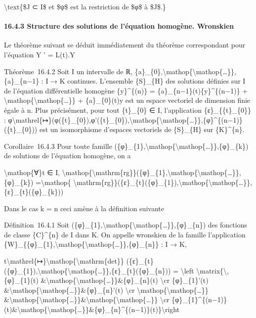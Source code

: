 \documentclass[]{article}
\begin{document}
\textbackslash{}text\{\$J ⊂ I\$ et \$ψ\$ est la restriction de \$φ\$ à
\$J\$.\}

\paragraph{16.4.3 Structure des solutions de l'équation homogène.
Wronskien}

Le théorème suivant se déduit immédiatement du théorème correspondant
pour l'équation Y ' = L(t).Y

Théorème~16.4.2 Soit I un intervalle de ℝ,
\{a\}\_\{0\},\textbackslash{}mathop\{\textbackslash{}mathop\{\ldots{}\}\},\{a\}\_\{n−1\}
: I → K continues. L'ensemble \{S\}\_\{H\} des solutions définies sur I
de l'équation différentielle homogène \{y\}\^{}\{(n)\} =
\{a\}\_\{n−1\}(t)\{y\}\^{}\{(n−1)\} +
\textbackslash{}mathop\{\textbackslash{}mathop\{\ldots{}\}\} +
\{a\}\_\{0\}(t)y est un espace vectoriel de dimension finie égale à n.
Plus précisément, pour tout \{t\}\_\{0\} ∈ I, l'application
\{ε\}\_\{\{t\}\_\{0\}\} :
φ\textbackslash{}mathrel\{↦\}(φ(\{t\}\_\{0\}),φ'(\{t\}\_\{0\}),\textbackslash{}mathop\{\textbackslash{}mathop\{\ldots{}\}\},\{φ\}\^{}\{(n−1)\}(\{t\}\_\{0\}))
est un isomorphisme d'espaces vectoriels de \{S\}\_\{H\} sur
\{K\}\^{}\{n\}.

Corollaire~16.4.3 Pour toute famille
(\{φ\}\_\{1\},\textbackslash{}mathop\{\textbackslash{}mathop\{\ldots{}\}\},\{φ\}\_\{k\})
de solutions de l'équation homogène, on a

\textbackslash{}mathop\{∀\}t ∈ I,
\textbackslash{}mathop\{\textbackslash{}mathrm\{rg\}\}(\{φ\}\_\{1\},\textbackslash{}mathop\{\textbackslash{}mathop\{\ldots{}\}\},\{φ\}\_\{k\})
=\textbackslash{}mathop\{
\textbackslash{}mathrm\{rg\}\}(\{ε\}\_\{t\}(\{φ\}\_\{1\}),\textbackslash{}mathop\{\textbackslash{}mathop\{\ldots{}\}\},\{ε\}\_\{t\}(\{φ\}\_\{k\}))

Dans le cas k = n ceci amène à la définition suivante

Définition~16.4.1 Soit
(\{φ\}\_\{1\},\textbackslash{}mathop\{\textbackslash{}mathop\{\ldots{}\}\},\{φ\}\_\{n\})
des fonctions de classe \{C\}\^{}\{n\} de I dans K. On appelle wronskien
de la famille l'application
\{W\}\_\{\{φ\}\_\{1\},\textbackslash{}mathop\{\textbackslash{}mathop\{\ldots{}\}\},\{φ\}\_\{n\}\}
: I → K,

t\textbackslash{}mathrel\{↦\}\textbackslash{}mathop\{\textbackslash{}mathrm\{det\}\}
(\{ε\}\_\{t\}(\{φ\}\_\{1\}),\textbackslash{}mathop\{\textbackslash{}mathop\{\ldots{}\}\},\{ε\}\_\{t\}(\{φ\}\_\{n\}))
= \textbackslash{}left
\textbar{}\textbackslash{}matrix\{\textbackslash{},\{φ\}\_\{1\}(t)
\&\textbackslash{}mathop\{\textbackslash{}mathop\{\ldots{}\}\}\&\{φ\}\_\{n\}(t)
\textbackslash{}cr \{φ\}\_\{1\}'(t)
\&\textbackslash{}mathop\{\textbackslash{}mathop\{\ldots{}\}\}\&\{φ\}\_\{n\}'(t)
\textbackslash{}cr
\textbackslash{}mathop\{\textbackslash{}mathop\{\ldots{}\}\}
\&\textbackslash{}mathop\{\textbackslash{}mathop\{\ldots{}\}\}\&\textbackslash{}mathop\{\textbackslash{}mathop\{\ldots{}\}\}
\textbackslash{}cr
\{φ\}\_\{1\}\^{}\{(n−1)\}(t)\&\textbackslash{}mathop\{\textbackslash{}mathop\{\ldots{}\}\}\&\{φ\}\_\{n\}\^{}\{(n−1)\}(t)\}\textbackslash{}right
\textbar{}
\end{document}
